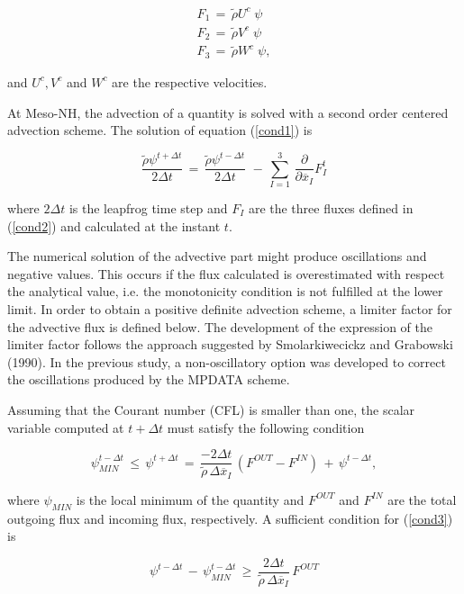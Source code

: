 \begin{eqnarray}
\label{cond2}
F_1\,=\,\tilde{\rho} U^{c} \;  \psi \\
F_2\,=\,\tilde{\rho} V^{c} \;  \psi \\
F_3\,=\,\tilde{\rho} W^{c} \;  \psi,
\end{eqnarray}

\noindent and $U^{c},V^{c}$ and $W^{c}$ are the respective velocities.

At Meso-NH, the advection of a quantity is solved with a second order centered advection
scheme. The solution of equation (\ref{cond1}) is

\begin{equation}
\dfrac{\tilde{\rho} \psi^{t+\Delta t}} {2 \Delta t} \, = \,
\dfrac{\tilde{\rho} \psi^{t-\Delta t}} {2 \Delta t} \,
 \, - \, \sum_{I=1}^{3} \,  \dfrac{\partial }{\partial \overline{x}_I}
F_{I}^{t}
\end{equation}

\noindent where $2\Delta t$ is the leapfrog time step and $F_I$ are the three fluxes defined
in (\ref{cond2}) and calculated at the instant $t$.

The numerical solution of the advective part might produce oscillations and
negative values. This occurs if
the flux calculated is overestimated with respect the analytical value, i.e. the
monotonicity condition is not fulfilled at the lower limit. In order to obtain a
positive definite advection scheme, a limiter factor for the advective flux is
defined below. The development of the expression of the limiter factor follows
the approach suggested by Smolarkiwecickz and Grabowski (1990). In the previous
study, a non-oscillatory option was developed to correct the oscillations produced by
the MPDATA scheme.

Assuming that the Courant number (CFL) is
smaller than one, the scalar variable computed at $t+\Delta t$ must satisfy the
following condition

\begin{equation}
\label{cond3}
\psi_{MIN}^{t-\Delta t}\,\leq \,
\psi^{t+\Delta t} \, = \,
\dfrac{-2 \Delta t}{\tilde{\rho}\,\Delta \overline{x}_{I}}\, (F^{OUT}-F^{IN}) \,+\,
\psi^{t-\Delta t},
\end{equation}

\noindent where $\psi_{MIN}$ is the local minimum of the quantity and $F^{OUT}$ and $F^{IN}$ are
the total
outgoing flux and incoming flux, respectively. A sufficient condition for (\ref{cond3}) is

\begin{equation}
\label{cond4}
\psi^{t-\Delta t}  \, - \,
\psi_{MIN}^{t-\Delta t}\,\geq \,
\dfrac{2 \Delta t}{\tilde{\rho}\,\Delta \overline{x}_{I}}\, F^{OUT}
\end{equation}

